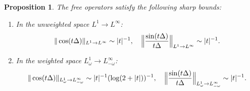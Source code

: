 \documentclass[reqno]{amsart}
\newtheorem{proposition}[theorem]{Proposition}
\numberwithin{equation}{section}
\begin{document}
\begin{proposition}\label{free_case}
The free  operators satisfy the following sharp bounds:
\vskip 0.1cm
\begin{enumerate}
\item[(i)] In the unweighted space $L^1 \to L^{\infty}$:
\[
\|\cos (t \Delta) \|_{L^1 \to L^{\infty}} \sim |t|^{-1}, \quad
\Bigl\|\frac{\sin (t \Delta)}{t\Delta}\Bigr\|_{L^1 \to L^{\infty}} \sim |t|^{-1}.
\]
\vskip 0.2cm
\item[(ii)] In the weighted space $L^1_\omega \to L^\infty_{-\omega}$:
\[
\|\cos (t \Delta) \|_{L^1_\omega \to L^{\infty}_{-\omega}} \sim |t|^{-1}(\log (2+|t|))^{-1}, \quad
\Bigl\|\frac{\sin (t \Delta)}{t\Delta} \Bigr\|_{L^1_\omega \to L^{\infty}_{-\omega}} \sim |t|^{-1}.
\]
\end{enumerate}
\end{proposition}

\end{document}
